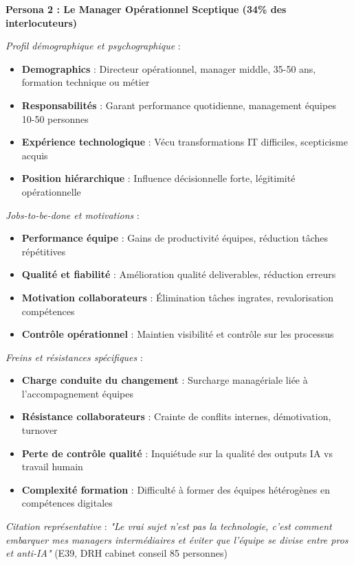 \textbf{Persona 2 : Le Manager Opérationnel Sceptique (34\% des interlocuteurs)}

\emph{Profil démographique et psychographique} :
\begin{itemize}
    \item \textbf{Demographics} : Directeur opérationnel, manager middle, 35-50 ans, formation technique ou métier
    \item \textbf{Responsabilités} : Garant performance quotidienne, management équipes 10-50 personnes
    \item \textbf{Expérience technologique} : Vécu transformations IT difficiles, scepticisme acquis
    \item \textbf{Position hiérarchique} : Influence décisionnelle forte, légitimité opérationnelle
\end{itemize}

\emph{Jobs-to-be-done et motivations} :
\begin{itemize}
    \item \textbf{Performance équipe} : Gains de productivité équipes, réduction tâches répétitives
    \item \textbf{Qualité et fiabilité} : Amélioration qualité deliverables, réduction erreurs
    \item \textbf{Motivation collaborateurs} : Élimination tâches ingrates, revalorisation compétences
    \item \textbf{Contrôle opérationnel} : Maintien visibilité et contrôle sur les processus
\end{itemize}

\emph{Freins et résistances spécifiques} :
\begin{itemize}
    \item \textbf{Charge conduite du changement} : Surcharge managériale liée à l'accompagnement équipes
    \item \textbf{Résistance collaborateurs} : Crainte de conflits internes, démotivation, turnover
    \item \textbf{Perte de contrôle qualité} : Inquiétude sur la qualité des outputs IA vs travail humain
    \item \textbf{Complexité formation} : Difficulté à former des équipes hétérogènes en compétences digitales
\end{itemize}

\emph{Citation représentative} : \emph{"Le vrai sujet n'est pas la technologie, c'est comment embarquer mes managers intermédiaires et éviter que l'équipe se divise entre pros et anti-IA"} (E39, DRH cabinet conseil 85 personnes)

